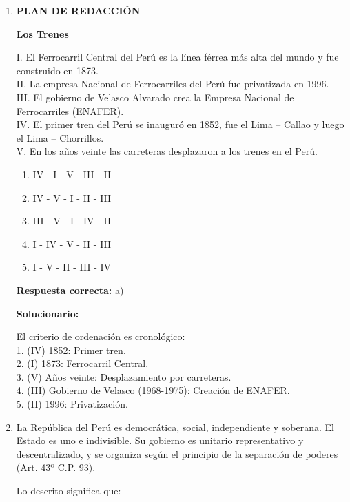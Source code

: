 \begin{enumerate}[resume]
	\item \textbf{PLAN DE REDACCIÓN}

	\begin{center}
		\textbf{Los Trenes}
	\end{center}

	I. El Ferrocarril Central del Perú es la línea férrea más alta del mundo y fue construido en 1873. \\
	II. La empresa Nacional de Ferrocarriles del Perú fue privatizada en 1996. \\
	III. El gobierno de Velasco Alvarado crea la Empresa Nacional de Ferrocarriles (ENAFER). \\
	IV. El primer tren del Perú se inauguró en 1852, fue el Lima -- Callao y luego el Lima -- Chorrillos. \\
	V. En los años veinte las carreteras desplazaron a los trenes en el Perú.

	\begin{enumerate}[label=\alph*)]
		\item IV - I - V - III - II
		\item IV - V - I - II - III
		\item III - V - I - IV - II
		\item I - IV - V - II - III
		\item I - V - II - III - IV
	\end{enumerate}

	\textbf{Respuesta correcta:} a)

	\vspace{2mm}
	\textbf{Solucionario:}

	El criterio de ordenación es cronológico:\\
	1. (IV) 1852: Primer tren.\\
	2. (I) 1873: Ferrocarril Central.\\
	3. (V) Años veinte: Desplazamiento por carreteras.\\
	4. (III) Gobierno de Velasco (1968-1975): Creación de ENAFER.\\
	5. (II) 1996: Privatización.\\


	\item La República del Perú es democrática, social, independiente y soberana. El Estado es uno e indivisible. Su gobierno es unitario representativo y descentralizado, y se organiza según el principio de la separación de poderes (Art. 43º C.P. 93).

	Lo descrito significa que:


\end{enumerate}

